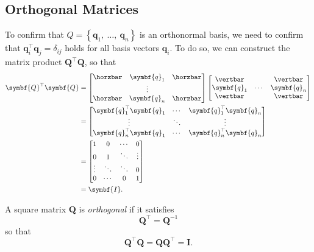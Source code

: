 \documentclass{article}
\begin{document}
\subsection{Orthogonal Matrices}
To confirm that \(Q = \left\{ \symbf{q}_1,\: \dots,\: \symbf{q}_n
\right\}\) is an orthonormal basis, we need to confirm that
\(\symbf{q}_i^\top \symbf{q}_j = \delta_{ij}\) holds for all basis
vectors \(\symbf{q}_i\). To do so, we can construct the matrix product
\(\symbf{Q}^\top \symbf{Q}\), so that
\begin{align*}
    \symbf{Q}^\top \symbf{Q} & =
    \begin{bmatrix}
        \horzbar & \symbf{q}_1 & \horzbar \\
                 & \vdots                 \\
        \horzbar & \symbf{q}_n & \horzbar
    \end{bmatrix}
    \begin{bmatrix}
        \vertbar    &        & \vertbar    \\
        \symbf{q}_1 & \cdots & \symbf{q}_n \\
        \vertbar    &        & \vertbar
    \end{bmatrix}
    \\
                             & =
    \begin{bmatrix}
        \symbf{q}_1^\top \symbf{q}_1 & \cdots & \symbf{q}_1^\top\symbf{q}_n  \\
        \vdots                       & \ddots & \vdots                       \\
        \symbf{q}_n^\top \symbf{q}_1 & \cdots & \symbf{q}_n^\top \symbf{q}_n
    \end{bmatrix}
    \\
                             & =
    \begin{bmatrix}
        1      & 0      & \cdots & 0      \\
        0      & 1      & \ddots & \vdots \\
        \vdots & \ddots & \ddots & 0      \\
        0      & \cdots & 0      & 1
    \end{bmatrix}
    \\
                             & = \symbf{I}.
\end{align*}
\begin{definition}
    A square matrix \(\symbf{Q}\) is \textit{orthogonal} if it satisfies
    \begin{equation*}
        \symbf{Q}^\top = \symbf{Q}^{-1}
    \end{equation*}
    so that
    \begin{equation*}
        \symbf{Q}^\top \symbf{Q} = \symbf{Q}\symbf{Q}^\top = \symbf{I}.
    \end{equation*}
\end{definition}
\end{document}
